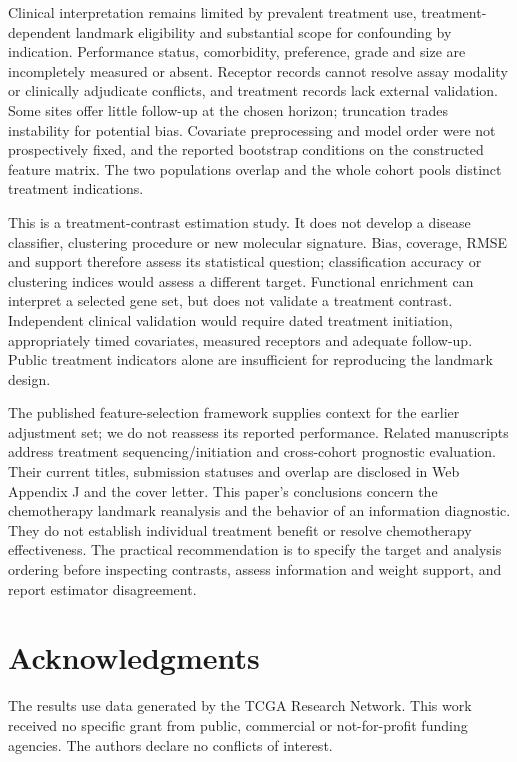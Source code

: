 \documentclass[12pt,letterpaper]{article}
\begin{document}
Clinical interpretation remains limited by prevalent treatment use, treatment-dependent landmark eligibility
and substantial scope for confounding by indication. Performance status, comorbidity, preference, grade and
size are incompletely measured or absent. Receptor records cannot resolve assay modality or clinically
adjudicate conflicts, and treatment records lack external validation. Some sites offer little follow-up at
the chosen horizon; truncation trades instability for potential bias. Covariate preprocessing and model order
were not prospectively fixed, and the reported bootstrap conditions on the constructed feature matrix.
The two populations overlap and the whole cohort pools distinct treatment indications.

This is a treatment-contrast estimation study. It does not develop a disease classifier, clustering procedure
or new molecular signature. Bias, coverage, RMSE and support therefore assess its statistical question;
classification accuracy or clustering indices would assess a different target. Functional enrichment can
interpret a selected gene set, but does not validate a treatment contrast. Independent clinical validation
would require dated treatment initiation, appropriately timed covariates, measured receptors and adequate
follow-up. Public treatment indicators alone are insufficient for reproducing the landmark design.

The published feature-selection framework \citep{krikun} supplies context for the earlier adjustment set;
we do not reassess its reported performance. Related manuscripts address treatment sequencing/initiation
and cross-cohort prognostic evaluation. Their current titles, submission statuses and overlap are disclosed
in Web Appendix J and the cover letter. This paper's conclusions concern the chemotherapy landmark
reanalysis and the behavior of an information diagnostic. They do not establish individual treatment benefit
or resolve chemotherapy effectiveness. The practical recommendation is to specify the target and analysis
ordering before inspecting contrasts, assess information and weight support, and report estimator disagreement.

\section*{Acknowledgments}
The results use data generated by the TCGA Research Network. This work received no specific grant
from public, commercial or not-for-profit funding agencies. The authors declare no conflicts of interest.
\end{document}
